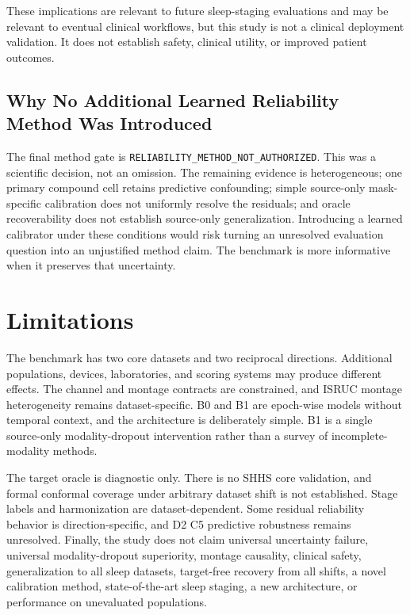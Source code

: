 \documentclass[10pt,twocolumn]{article}
\begin{document}
These implications are relevant to future sleep-staging evaluations and may be relevant to eventual clinical workflows, but this study is not a clinical deployment validation. It does not establish safety, clinical utility, or improved patient outcomes.

\subsection{Why No Additional Learned Reliability Method Was Introduced}
The final method gate is \texttt{RELIABILITY\_METHOD\_NOT\_AUTHORIZED}. This was a scientific decision, not an omission. The remaining evidence is heterogeneous; one primary compound cell retains predictive confounding; simple source-only mask-specific calibration does not uniformly resolve the residuals; and oracle recoverability does not establish source-only generalization. Introducing a learned calibrator under these conditions would risk turning an unresolved evaluation question into an unjustified method claim. The benchmark is more informative when it preserves that uncertainty.

\section{Limitations}
The benchmark has two core datasets and two reciprocal directions. Additional populations, devices, laboratories, and scoring systems may produce different effects. The channel and montage contracts are constrained, and ISRUC montage heterogeneity remains dataset-specific. B0 and B1 are epoch-wise models without temporal context, and the architecture is deliberately simple. B1 is a single source-only modality-dropout intervention rather than a survey of incomplete-modality methods.

The target oracle is diagnostic only. There is no SHHS core validation, and formal conformal coverage under arbitrary dataset shift is not established. Stage labels and harmonization are dataset-dependent. Some residual reliability behavior is direction-specific, and D2 C5 predictive robustness remains unresolved. Finally, the study does not claim universal uncertainty failure, universal modality-dropout superiority, montage causality, clinical safety, generalization to all sleep datasets, target-free recovery from all shifts, a novel calibration method, state-of-the-art sleep staging, a new architecture, or performance on unevaluated populations.
\end{document}
